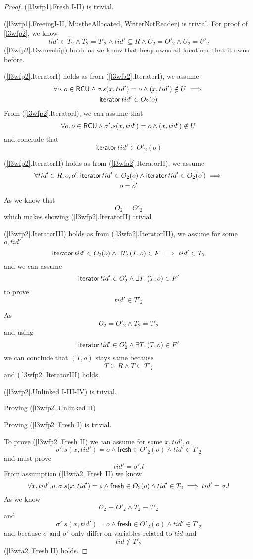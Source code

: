 \begin{proof}
(\ref{l3wfp1}.\textsf{Fresh I-II}) is trivial.

(\ref{l3wfp1}.\textsf{FreeingI-II, MustbeAllocated, WriterNotReader}) is trivial.
For proof of \ref{l3wfp2}, we know 
\[ tid' \in T_{2} \land T_{2} = T'_{2} \land tid' \subseteq R \land  O_{2} = O'_{2} \land U_{2}  = U'_{2} \]
(\ref{l3wfp2}.\textsf{Ownership}) holds as we know that heap owns all locations that it owns before. 

(\ref{l3wfp2}.\textsf{IteratorI}) holds as from (\ref{l3wfa2}.\textsf{IteratorI}), we assume
\begin{gather*} \forall o \ldotp o \in \mathsf{RCU} \land \sigma.s(x,tid') = o \land (x,tid') \notin U \implies \\
\mathsf{iterator} \, tid' \in O_{2}(o)\end{gather*}From (\ref{l3wfp2}.\textsf{IteratorI}), we can assume that 
\[\forall o \ldotp o \in \mathsf{RCU} \land \sigma'.s(x,tid') = o \land (x,tid') \notin U\] and conclude that 
\[\mathsf{iterator} \, tid' \in O'_{2}(o)\]

(\ref{l3wfp2}.\textsf{IteratorII}) holds as from (\ref{l3wfa2}.\textsf{IteratorII}), we assume
\begin{gather} \forall tid' \in R , o,o' \ldotp \mathsf{iterator} \, tid' \in O_{2}(o) \land \mathsf{iterator} \, tid' \in O_{2}(o') \implies \\
 o=o' \end{gather}
As we know that 
\[O_{2} = O'_{2}\] which makes showing
(\ref{l3wfp2}.\textsf{IteratorII}) trivial.

(\ref{l3wfp2}.\textsf{IteratorIII}) holds as from (\ref{l3wfa2}.\textsf{IteratorIII}), we assume for some $o,tid'$
 \[ \mathsf{iterator} \, tid' \in O_{2}(o) \land \exists T \ldotp (T,o) \in F \implies tid' \in T_{2}\] and we can assume
\[\mathsf{iterator} \, tid' \in O'_{2} \land \exists T \ldotp (T,o) \in F'\] to prove
\[tid' \in T'_{2}\]

As \[ O_{2} = O'_{2} \land T_{2} = T'_{2} \] and using 
\[ \mathsf{iterator} \, tid'  \in O'_{2} \land \exists T \ldotp (T,o) \in F' \] we can conclude that $(T,o)$ stays same because 
\[T \subseteq R\land T \subseteq T'_{2}\] and 
(\ref{l3wfp2}.\textsf{IteratorIII}) holds.

(\ref{l3wfp2}.\textsf{Unlinked I-III-IV}) is trivial.

Proving (\ref{l3wfp2}.\textsf{Unlinked II}) 

Proving (\ref{l3wfp2}.\textsf{Fresh I}) is trivial.

To prove (\ref{l3wfp2}.\textsf{Fresh II})  we can  assume for some $x,tid',o$
\[\sigma'.s(x,tid') = o \land \mathsf{fresh} \in O'_{2}(o) \land tid' \in T'_{2}\]
and must prove 
\[tid' = \sigma'.l\]
From assumption (\ref{l3wfa2}.\textsf{Fresh II}) we know 
\[\forall x,tid',o \ldotp \sigma.s(x,tid') = o \land \mathsf{fresh} \in O_{2}(o) \land tid' \in T_{2} \implies tid' = \sigma.l\]
As we know \[O_{2} = O'_{2} \land T_{2} = T'_{2}\] and \[\sigma'.s(x,tid') = o \land \mathsf{fresh} \in O'_{2}(o) \land tid' \in T'_{2}\] and because $\sigma$ and $\sigma'$ only differ on  variables related to $tid$ and 
\[tid \notin T'_{2}\] (\ref{l3wfa2}.\textsf{Fresh II}) holds.


\end{proof}

